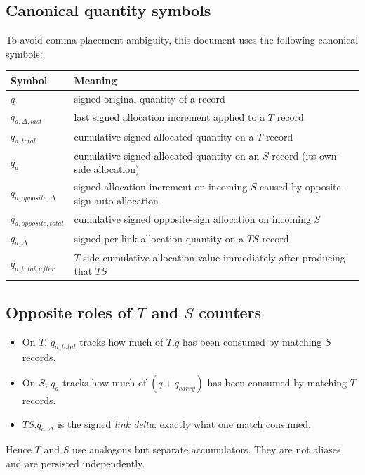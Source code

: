 \documentclass[sigconf]{acmart}
\begin{document}
\subsection{Canonical quantity symbols}
To avoid comma-placement ambiguity, this document uses the following canonical symbols:
\begin{center}
\begin{tabularx}{0.98\linewidth}{lY}
\toprule
Symbol & Meaning \\
\midrule
$q$ & signed original quantity of a record \\
$q_{a,\Delta,last}$ & last signed allocation increment applied to a \emph{$T$} record \\
$q_{a,total}$ & cumulative signed allocated quantity on a \emph{$T$} record \\
$q_a$ & cumulative signed allocated quantity on an \emph{$S$} record (its own-side allocation) \\
$q_{a,opposite,\Delta}$ & signed allocation increment on incoming $S$ caused by opposite-sign auto-allocation \\
$q_{a,opposite,total}$ & cumulative signed opposite-sign allocation on incoming $S$ \\
$q_{a,\Delta}$ & signed per-link allocation quantity on a \emph{$TS$} record \\
$q_{a,total,after}$ & $T$-side cumulative allocation value immediately after producing that $TS$ \\
\bottomrule
\end{tabularx}
\end{center}

\subsection{Opposite roles of $T$ and $S$ counters}
\begin{itemize}[leftmargin=*]
  \item On \textbf{$T$}, $q_{a,total}$ tracks how much of $T.q$ has been consumed by matching $S$ records.
  \item On \textbf{$S$}, $q_a$ tracks how much of $(q + q_{carry})$ has been consumed by matching $T$ records.
  \item $TS.q_{a,\Delta}$ is the signed \emph{link delta}: exactly what one match consumed.
\end{itemize}

Hence $T$ and $S$ use analogous but separate accumulators.
They are not aliases and are persisted independently.
\end{document}
